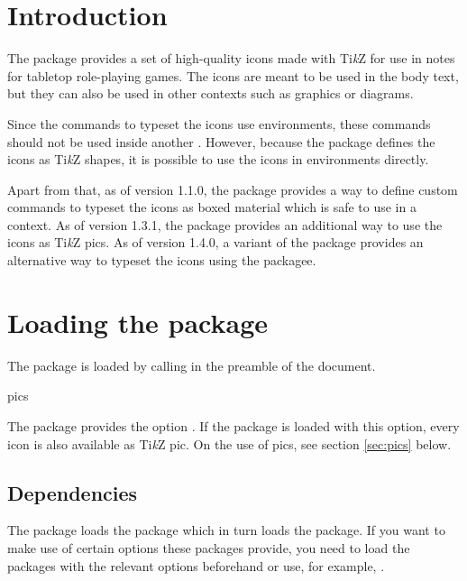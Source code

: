 \documentclass[a4paper]{article}
\begin{document}
\printdoctitle

\bigskip

\section{Introduction}

The  package provides a set of high-quality icons made with Ti\emph{k}Z for use in notes for tabletop role-playing games. The icons are meant to be used in the body text, but they can also be used in other contexts such as graphics or diagrams.

Since the commands to typeset the icons use  environments, these commands should not be used inside another . However, because the package defines the icons as Ti\emph{k}Z shapes, it is possible to use the icons in  environments directly. 

Apart from that, as of version 1.1.0, the package provides a way to define custom commands to typeset the icons as boxed material which is safe to use in a  context. As of version 1.3.1, the package provides an additional way to use the icons as Ti\emph{k}Z pics. As of version 1.4.0, a variant of the package provides an alternative way to typeset the icons using the  packagee.

\section{Loading the package}

The  package is loaded by calling \macro{\usepackage{dndicons}} in the preamble of the document. 

\begin{macrodef}pics\end{macrodef}
The package provides the option . If the package is loaded with this option, every icon is also available as Ti\emph{k}Z pic. On the use of pics, see section \ref{sec:pics} below.

\subsection{Dependencies}

The package loads the  package which in turn loads the  package. If you want to make use of certain options these packages provide, you need to load the packages with the relevant options beforehand or use, for example, .
\end{document}
